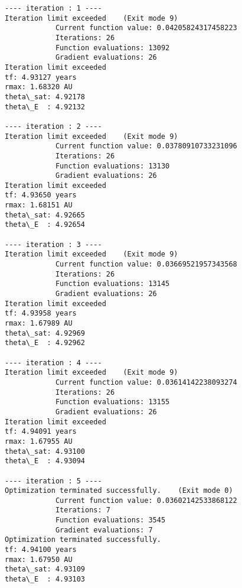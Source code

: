 \documentclass[11pt]{article}
\begin{document}
    \begin{Verbatim}[commandchars=\\\{\}]
---- iteration : 1 ----
Iteration limit exceeded    (Exit mode 9)
            Current function value: 0.04205824317458223
            Iterations: 26
            Function evaluations: 13092
            Gradient evaluations: 26
Iteration limit exceeded
tf: 4.93127 years
rmax: 1.68320 AU
theta\_sat: 4.92178
theta\_E  : 4.92132

---- iteration : 2 ----
Iteration limit exceeded    (Exit mode 9)
            Current function value: 0.03780910733231096
            Iterations: 26
            Function evaluations: 13130
            Gradient evaluations: 26
Iteration limit exceeded
tf: 4.93650 years
rmax: 1.68151 AU
theta\_sat: 4.92665
theta\_E  : 4.92654

---- iteration : 3 ----
Iteration limit exceeded    (Exit mode 9)
            Current function value: 0.03669521957343568
            Iterations: 26
            Function evaluations: 13145
            Gradient evaluations: 26
Iteration limit exceeded
tf: 4.93958 years
rmax: 1.67989 AU
theta\_sat: 4.92969
theta\_E  : 4.92962

---- iteration : 4 ----
Iteration limit exceeded    (Exit mode 9)
            Current function value: 0.03614142238093274
            Iterations: 26
            Function evaluations: 13155
            Gradient evaluations: 26
Iteration limit exceeded
tf: 4.94091 years
rmax: 1.67955 AU
theta\_sat: 4.93100
theta\_E  : 4.93094

---- iteration : 5 ----
Optimization terminated successfully.    (Exit mode 0)
            Current function value: 0.03602142533868122
            Iterations: 7
            Function evaluations: 3545
            Gradient evaluations: 7
Optimization terminated successfully.
tf: 4.94100 years
rmax: 1.67950 AU
theta\_sat: 4.93109
theta\_E  : 4.93103


    \end{Verbatim}
\end{document}
